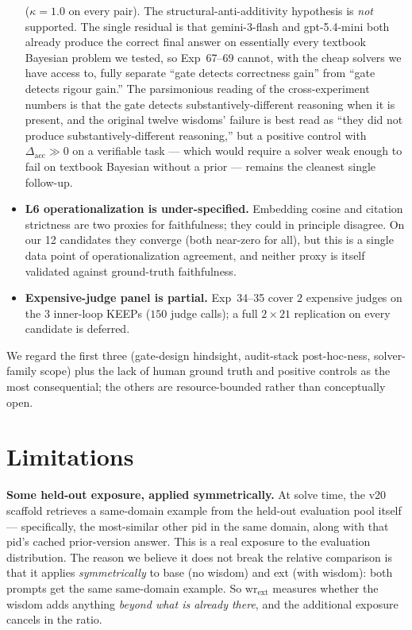 \documentclass{article}
\begin{document}
\begin{CJK*}{UTF8}{gbsn}
\begin{itemize}[leftmargin=*,topsep=2pt,itemsep=2pt]
    (\(\kappa = 1.0\) on every pair). The structural-anti-additivity
    hypothesis is \emph{not} supported. The single residual is
    that gemini-3-flash and gpt-5.4-mini both already produce the
    correct final answer on essentially every textbook Bayesian
    problem we tested, so Exp~67--69 cannot, with the cheap
    solvers we have access to, fully separate ``gate detects
    correctness gain'' from ``gate detects rigour gain.'' The
    parsimonious reading of the cross-experiment numbers is that
    the gate detects substantively-different reasoning when it is
    present, and the original twelve wisdoms' failure is best
    read as ``they did not produce substantively-different
    reasoning,'' but a positive control with \(\Delta_{\mathrm{acc}}
    \gg 0\) on a verifiable task --- which would require a solver
    weak enough to fail on textbook Bayesian without a prior ---
    remains the cleanest single follow-up.
  \item \textbf{L6 operationalization is under-specified.}
    Embedding cosine and citation strictness are two proxies
    for faithfulness; they could in principle disagree. On our
    12 candidates they converge (both near-zero for all), but
    this is a single data point of operationalization
    agreement, and neither proxy is itself validated against
    ground-truth faithfulness.
  \item \textbf{Expensive-judge panel is partial.} Exp~34--35
    cover \(2\) expensive judges on the \(3\) inner-loop KEEPs
    (\(150\) judge calls); a full \(2 \times 21\) replication on
    every candidate is deferred.
\end{itemize}

\noindent We regard the first three (gate-design hindsight,
audit-stack post-hoc-ness, solver-family scope) plus the lack of
human ground truth and positive controls as the most
consequential; the others are resource-bounded rather than
conceptually open.

\section{Limitations}
\label{sec:limitations}

\textbf{Some held-out exposure, applied symmetrically.} At
solve time, the v20 scaffold retrieves a same-domain example
from the held-out evaluation pool itself --- specifically, the
most-similar other pid in the same domain, along with that pid's
cached prior-version answer. This is a real exposure to the
evaluation distribution. The reason we believe it does not
break the relative comparison is that it applies
\emph{symmetrically} to base (no wisdom) and ext (with wisdom):
both prompts get the same same-domain example. So
\(\mathrm{wr}_{\mathrm{ext}}\) measures whether the wisdom adds
anything \emph{beyond what is already there}, and the additional
exposure cancels in the ratio.


\end{CJK*}
\end{document}
